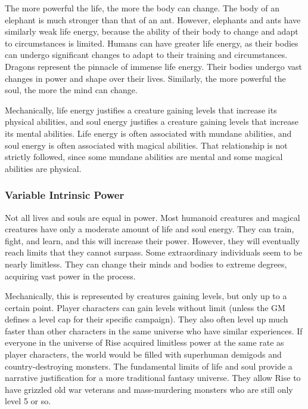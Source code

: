     The more powerful the life, the more the body can change.
    The body of an elephant is much stronger than that of an ant.
    However, elephants and ants have similarly weak life energy, because the ability of their body to change and adapt to circumstances is limited.
    Humans can have greater life energy, as their bodies can undergo significant changes to adapt to their training and circumstances.
    Dragons represent the pinnacle of immense life energy.
    Their bodies undergo vast changes in power and shape over their lives.
    Similarly, the more powerful the soul, the more the mind can change.

    Mechanically, life energy justifies a creature gaining levels that increase its physical abilities, and soul energy justifies a creature gaining levels that increase its mental abilities.
    Life energy is often associated with mundane abilities, and soul energy is often associated with magical abilities.
    That relationship is not strictly followed, since some mundane abilities are mental and some magical abilities are physical.

    \subsubsection{Variable Intrinsic Power}
      Not all lives and souls are equal in power.
      Most humanoid creatures and magical creatures have only a moderate amount of life and soul energy.
      They can train, fight, and learn, and this will increase their power.
      However, they will eventually reach limits that they cannot surpass.
      Some extraordinary individuals seem to be nearly limitless.
      They can change their minds and bodies to extreme degrees, acquiring vast power in the process.

      Mechanically, this is represented by creatures gaining levels, but only up to a certain point.
      Player characters can gain levels without limit (unless the GM defines a level cap for their specific campaign).
      They also often level up much faster than other characters in the same universe who have similar experiences.
      If everyone in the universe of Rise acquired limitless power at the same rate as player characters, the world would be filled with superhuman demigods and country-destroying monsters.
      The fundamental limits of life and soul provide a narrative justification for a more traditional fantasy universe.
      They allow Rise to have grizzled old war veterans and mass-murdering monsters who are still only level 5 or so.

